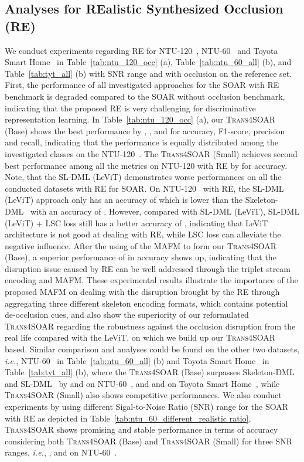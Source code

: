\documentclass[lettersize,journal]{IEEEtran}
\begin{document}
\subsection{Analyses for REalistic Synthesized Occlusion (RE)}
We conduct experiments regarding RE for NTU-120~\cite{liu2019ntu}, NTU-60~\cite{shahroudy2016ntu} and Toyota Smart Home~\cite{Das_2019_ICCV} in Table~\ref{tab:ntu_120_occ} (a), Table~\ref{tab:ntu_60_all} (b), and Table~\ref{tab:tyt_all} (b) with SNR range  and with occlusion on the reference set.
First, the performance of all investigated approaches for the SOAR with RE benchmark is degraded compared to the SOAR without occlusion benchmark, indicating that the proposed RE is very challenging for discriminative representation learning.
In Table~\ref{tab:ntu_120_occ} (a), our \textsc{Trans4SOAR} (Base) shows the best performance by , ,  and  for accuracy, F1-score, precision and recall, indicating that the performance is equally distributed among the investigated classes on the NTU-120~\cite{liu2019ntu}.
The \textsc{Trans4SOAR} (Small) achieves second best performance among all the metrics on NTU-120 with RE by  for accuracy. Note, that the SL-DML (LeViT) demonstrates worse performances on all the conducted datasets with RE for SOAR. On NTU-120~\cite{liu2019ntu} with RE, the SL-DML (LeViT) approach only has an accuracy of  which is lower than the Skeleton-DML~\cite{memmesheimer2020skeleton_dml} with an accuracy of . However, compared with SL-DML (LeViT), SL-DML (LeViT) + LSC loss still has a better accuracy of , indicating that LeViT architecture is not good at dealing with RE, while LSC loss can alleviate the negative influence.
After the using of the MAFM to form our \textsc{Trans4SOAR} (Base), a superior performance of  in accuracy shows up, indicating that the disruption issue caused by RE can be well addressed through the triplet stream encoding and MAFM.
These experimental results illustrate the importance of the proposed MAFM on dealing with the disruption brought by the RE through aggregating three different skeleton encoding formats, which contains potential de-occlusion cues, and also show the superiority of our reformulated \textsc{Trans4SOAR} regarding the robustness against the occlusion disruption from the real life compared with the LeViT, on which we build up our \textsc{Trans4SOAR} based.
Similar comparison and analyses could be found on the other two datasets, \textit{i.e.}, NTU-60~\cite{shahroudy2016ntu} in Table~\ref{tab:ntu_60_all} (b) and Toyota Smart Home~\cite{Das_2019_ICCV} in Table~\ref{tab:tyt_all} (b), where the \textsc{Trans4SOAR} (Base) surpasses Skeleton-DML~\cite{memmesheimer2020skeleton_dml} and SL-DML~\cite{memmesheimer2021sl} by  and   on NTU-60~\cite{shahroudy2016ntu}, and  and  on Toyota Smart Home~\cite{Das_2019_ICCV}, while \textsc{Trans4SOAR} (Small) also shows competitive performances. We also conduct experiments by using different Sigal-to-Noise Ratio (SNR) range for the SOAR with RE as depicted in Table~\ref{tab:ntu_60_different_realistic ratio}, \textsc{Trans4SOAR} shows promising and stable performance  in terms of accuracy considering both \textsc{Trans4SOAR} (Base) and \textsc{Trans4SOAR} (Small) for three SNR ranges, \textit{i.e.}, ,  and  on NTU-60~\cite{shahroudy2016ntu}. 
\end{document}
